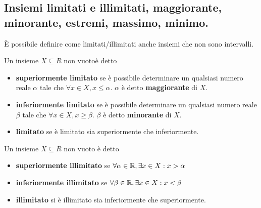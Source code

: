 \documentclass{book}     %
\begin{document}
\subsection{Insiemi limitati e illimitati, maggiorante, minorante, estremi, massimo, minimo.}
È possibile definire come limitati/illimitati anche insiemi che non sono intervalli. 
\begin{boxdef}
    Un insieme $X\subseteq R$ non vuotoè detto
    \begin{itemize}
        \item \textbf{superiormente limitato} se è possibile determinare un qualsiasi numero reale $\alpha$ tale che $\forall x \in X, x\leq \alpha$. $\alpha$ è detto \textbf{maggiorante} di $X$.
        \item \textbf{inferiormente limitato} se è possibile determinare un qualsiasi numero reale $\beta$ tale che $\forall x \in X, x\geq \beta$. $\beta$ è detto \textbf{minorante} di $X$.
        \item \textbf{limitato} se è limitato sia superiormente che inferiormente.
    \end{itemize}
\end{boxdef}
\begin{boxdef}
    Un insieme $X\subseteq R$ non vuoto è detto 
    \begin{itemize}
        \item \textbf{superiormente illimitato} se $\forall \alpha \in \mathbb{R}, \exists x \in X : x>\alpha$
        \item \textbf{inferiormente illimitato} se $\forall \beta \in \mathbb{R}, \exists x \in X : x<\beta$
        \item \textbf{illimitato} si è illimitato sia inferiormente che superiormente.
    \end{itemize}
\end{boxdef}
\end{document}
